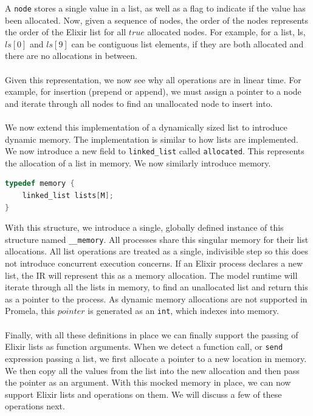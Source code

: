 A \texttt{node} stores a single value in a list, as well as a flag to indicate if the value has been allocated. Now, given a sequence of nodes, the order of the nodes represents the order of the Elixir list for all $true$ allocated nodes. For example, for a list, ls, $ls[0]$ and $ls[9]$ can be contiguous list elements, if they are both allocated and there are no allocations in between.
\\ \\
Given this representation, we now see why all operations are in linear time. For example, for insertion (prepend or append), we must assign a pointer to a node and iterate through all nodes to find an unallocated node to insert into.
\\ \\
We now extend this implementation of a dynamically sized list to introduce dynamic memory. The implementation is similar to how lists are implemented. We now introduce a new field to \texttt{linked\_list} called \texttt{allocated}. This represents the allocation of a list in memory. We now similarly introduce memory.
\begin{lstlisting}[language=C, xleftmargin=.1\linewidth, caption={Memory intermediate representation. Limit of M lists.}]
typedef memory {
    linked_list lists[M];
}
\end{lstlisting}
With this structure, we introduce a single, globally defined instance of this structure named \texttt{\_\_memory}. All processes share this singular memory for their list allocations. All list operations are treated as a single, indivisible step so this does not introduce concurrent execution concerns. If an Elixir process declares a new list, the IR will represent this as a memory allocation. The model runtime will iterate through all the lists in memory, to find an unallocated list and return this as a pointer to the process. As dynamic memory allocations are not supported in Promela, this $pointer$ is generated as an \texttt{int}, which indexes into memory. 
\\ \\
Finally, with all these definitions in place we can finally support the passing of Elixir lists as function arguments. When we detect a function call, or \texttt{send} expression passing a list, we first allocate a pointer to a new location in memory. We then copy all the values from the list into the new allocation and then pass the pointer as an argument. With this mocked memory in place, we can now support Elixir lists and operations on them. We will discuss a few of these operations next.
\\ \\
